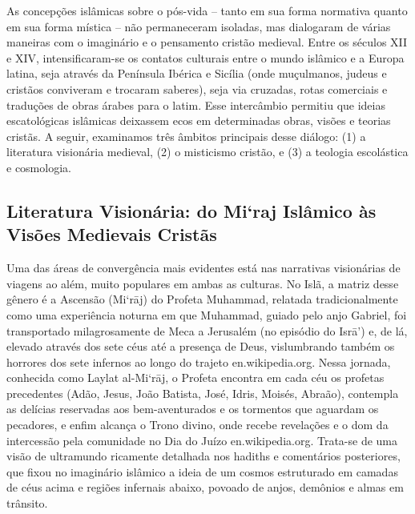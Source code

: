 As concepções islâmicas sobre o pós-vida -- tanto em sua forma normativa quanto em sua forma mística -- não permaneceram isoladas, mas dialogaram de várias maneiras com o imaginário e o pensamento cristão medieval. Entre os séculos XII e XIV, intensificaram-se os contatos culturais entre o mundo islâmico e a Europa latina, seja através da Península Ibérica e Sicília (onde muçulmanos, judeus e cristãos conviveram e trocaram saberes), seja via cruzadas, rotas comerciais e traduções de obras árabes para o latim. Esse intercâmbio permitiu que ideias escatológicas islâmicas deixassem ecos em determinadas obras, visões e teorias cristãs. A seguir, examinamos três âmbitos principais desse diálogo: (1) a literatura visionária medieval, (2) o misticismo cristão, e (3) a teologia escolástica e cosmologia.

\subsection{Literatura Visionária: do Mi‘raj Islâmico às Visões Medievais Cristãs}

Uma das áreas de convergência mais evidentes está nas narrativas visionárias de viagens ao além, muito populares em ambas as culturas. No Islã, a matriz desse gênero é a Ascensão (Mi‘rāj) do Profeta Muhammad, relatada tradicionalmente como uma experiência noturna em que Muhammad, guiado pelo anjo Gabriel, foi transportado milagrosamente de Meca a Jerusalém (no episódio do Isrā’) e, de lá, elevado através dos sete céus até a presença de Deus, vislumbrando também os horrores dos sete infernos ao longo do trajeto en.wikipedia.org. Nessa jornada, conhecida como Laylat al-Mi‘rāj, o Profeta encontra em cada céu os profetas precedentes (Adão, Jesus, João Batista, José, Idris, Moisés, Abraão), contempla as delícias reservadas aos bem-aventurados e os tormentos que aguardam os pecadores, e enfim alcança o Trono divino, onde recebe revelações e o dom da intercessão pela comunidade no Dia do Juízo en.wikipedia.org. Trata-se de uma visão de ultramundo ricamente detalhada nos hadiths e comentários posteriores, que fixou no imaginário islâmico a ideia de um cosmos estruturado em camadas de céus acima e regiões infernais abaixo, povoado de anjos, demônios e almas em trânsito.


